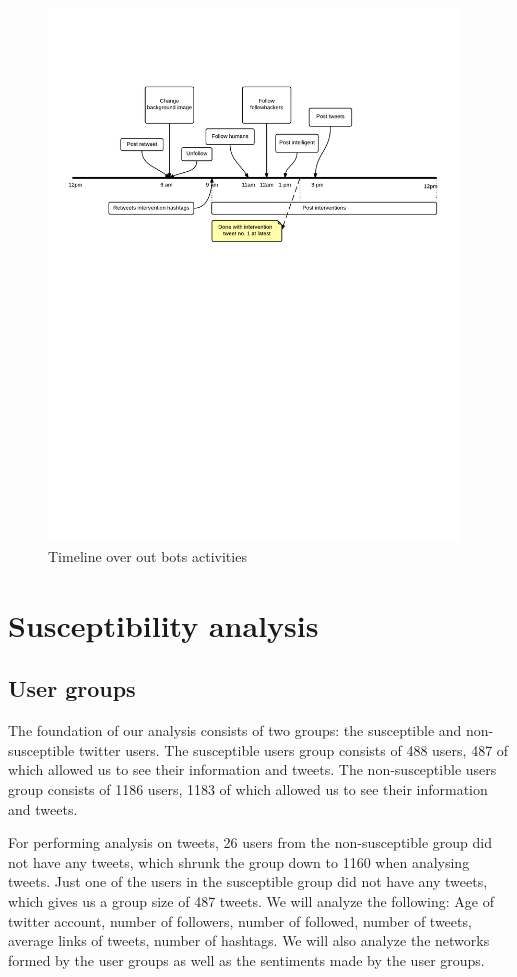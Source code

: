 \documentclass[10pt]{IEEEtran}
\begin{document}
\begin{figure}[H]
  \centering
 \hspace*{-1.8cm}\includegraphics[trim=0.5cm 15cm 0.5cm 4cm,width=4.3in]{intervention_timeline}
  \caption{Timeline over out bots activities}
  \label{fig:bot}
\end{figure}

\section{Susceptibility analysis}
\subsection{User groups}
The foundation of our analysis consists of two groups: the susceptible and non-susceptible twitter users. The susceptible users group consists of 488 users, 487 of which allowed us to see their information and tweets. The non-susceptible users group consists of 1186 users, 1183 of which allowed us to see their information and tweets.

For performing analysis on tweets, 26 users from the non-susceptible group did not have any tweets, which shrunk the group down to 1160 when analysing tweets. Just one of the users in the susceptible group did not have any tweets, which gives us a group size of 487 tweets.
We will analyze the following: Age of twitter account, number of followers, number of followed, number of tweets, average links of tweets, number of hashtags. We will also analyze the networks formed by the user groups as well as the sentiments made by the user groups.
\end{document}
